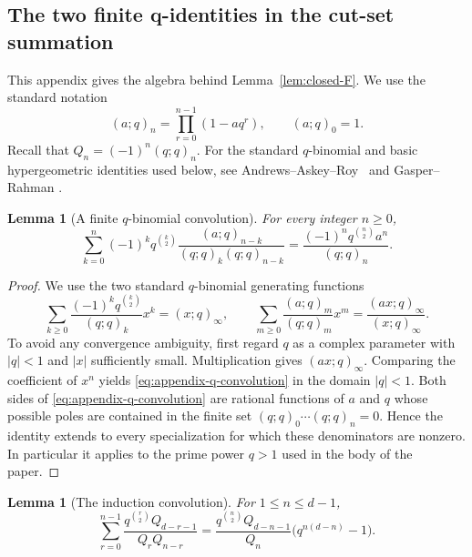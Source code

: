 \documentclass[11pt]{amsart}
\theoremstyle{plain}
\newtheorem{lemma}[theorem]{Lemma}
\theoremstyle{definition}
\numberwithin{equation}{section}
\begin{document}
\begin{appendix}

\section{The two finite q-identities in the cut-set summation}\label{app:q-identities}

This appendix gives the algebra behind Lemma~\ref{lem:closed-F}.  We use the standard notation
\[
  (a;q)_n=\prod_{r=0}^{n-1}(1-aq^r),\qquad (a;q)_0=1.
\]
Recall that $Q_n=(-1)^n(q;q)_n$.
For the standard \(q\)-binomial and basic hypergeometric identities used below, see
Andrews--Askey--Roy~\cite{AndrewsAskeyRoy} and Gasper--Rahman
\cite{GasperRahman}.

\begin{lemma}[A finite $q$-binomial convolution]\label{lem:appendix-q-convolution}
For every integer $n\ge0$,
\begin{equation}\label{eq:appendix-q-convolution}
  \sum_{k=0}^n
  (-1)^kq^{\binom k2}
  \frac{(a;q)_{n-k}}{(q;q)_k(q;q)_{n-k}}
  =\frac{(-1)^nq^{\binom n2}a^n}{(q;q)_n}.
\end{equation}
\end{lemma}

\begin{proof}
We use the two standard $q$-binomial generating functions
\[
  \sum_{k\ge0}\frac{(-1)^kq^{\binom k2}}{(q;q)_k}x^k=(x;q)_\infty,
  \qquad
  \sum_{m\ge0}\frac{(a;q)_m}{(q;q)_m}x^m=\frac{(ax;q)_\infty}{(x;q)_\infty}.
\]
To avoid any convergence ambiguity, first regard $q$ as a complex parameter with
$|q|<1$ and $|x|$ sufficiently small.  Multiplication gives $(ax;q)_\infty$.  Comparing the
coefficient of $x^n$ yields \eqref{eq:appendix-q-convolution} in the domain $|q|<1$.  Both
sides of \eqref{eq:appendix-q-convolution} are rational functions of $a$ and $q$ whose
possible poles are contained in the finite set $(q;q)_0\cdots(q;q)_n=0$.  Hence the identity
extends to every specialization for which these denominators are nonzero.  In particular it
applies to the prime power $q>1$ used in the body of the paper.
\end{proof}

\begin{lemma}[The induction convolution]\label{lem:appendix-first-q-identity}
For $1\le n\le d-1$,
\begin{equation}\label{eq:appendix-first-q-identity}
  \sum_{r=0}^{n-1}
  \frac{q^{\binom r2}Q_{d-r-1}}{Q_rQ_{n-r}}
  =
  \frac{q^{\binom n2}Q_{d-n-1}}{Q_n}\bigl(q^{n(d-n)}-1\bigr).
\end{equation}
\end{lemma}


\end{appendix}
\end{document}
